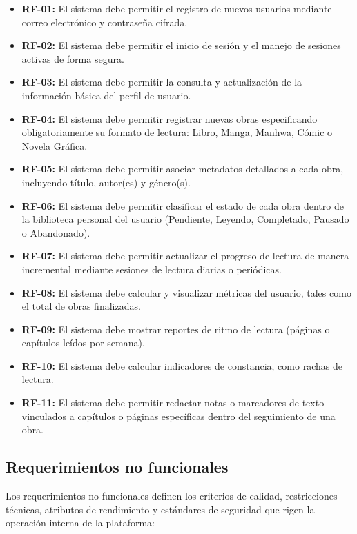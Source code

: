 \documentclass[12pt, atypical, journal]{article}
\begin{document}
\begin{itemize}
	\item \textbf{RF-01:} El sistema debe permitir el registro de nuevos usuarios mediante correo electrónico y contraseña cifrada.
	\item \textbf{RF-02:} El sistema debe permitir el inicio de sesión y el manejo de sesiones activas de forma segura.
	\item \textbf{RF-03:} El sistema debe permitir la consulta y actualización de la información básica del perfil de usuario.
	\item \textbf{RF-04:} El sistema debe permitir registrar nuevas obras especificando obligatoriamente su formato de lectura: Libro, Manga, Manhwa, Cómic o Novela Gráfica.
	\item \textbf{RF-05:} El sistema debe permitir asociar metadatos detallados a cada obra, incluyendo título, autor(es) y género(s).
	\item \textbf{RF-06:} El sistema debe permitir clasificar el estado de cada obra dentro de la biblioteca personal del usuario (Pendiente, Leyendo, Completado, Pausado o Abandonado).
	\item \textbf{RF-07:} El sistema debe permitir actualizar el progreso de lectura de manera incremental mediante sesiones de lectura diarias o periódicas.
	\item \textbf{RF-08:} El sistema debe calcular y visualizar métricas del usuario, tales como el total de obras finalizadas.
	\item \textbf{RF-09:} El sistema debe mostrar reportes de ritmo de lectura (páginas o capítulos leídos por semana).
	\item \textbf{RF-10:} El sistema debe calcular indicadores de constancia, como rachas de lectura.
	\item \textbf{RF-11:} El sistema debe permitir redactar notas o marcadores de texto vinculados a capítulos o páginas específicas dentro del seguimiento de una obra.
\end{itemize}

\subsection{Requerimientos no funcionales}
Los requerimientos no funcionales definen los criterios de calidad, restricciones técnicas, atributos de rendimiento y estándares de seguridad que rigen la operación interna de la plataforma:
\end{document}

